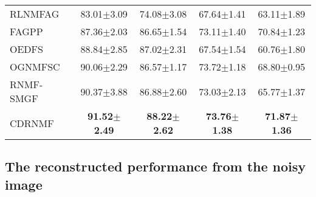 \documentclass[a4paper,fleqn]{cas-sc}
\begin{document}
\begin{table}[ht]
{\begin{tabular}{lcccc}
		RLNMFAG & 83.01$\pm$3.09 & 74.08$\pm$3.08 & 67.64$\pm$1.41 & 63.11$\pm$1.89 \\
		FAGPP & 87.36$\pm$2.03 & 86.65$\pm$1.54 & 73.11$\pm$1.40 & 70.84$\pm$1.23 \\
		OEDFS & 88.84$\pm$2.85 & 87.02$\pm$2.31 & 67.54$\pm$1.54 & 60.76$\pm$1.80 \\
		OGNMFSC & 90.06$\pm$2.29 & 86.57$\pm$1.17 & 73.72$\pm$1.18 & 68.80$\pm$0.95 \\
		RNMF-SMGF & 90.37$\pm$3.88 & 86.88$\pm$2.60 & 73.03$\pm$2.13 & 65.77$\pm$1.37 \\
		CDRNMF & \textbf{91.52$\pm$2.49} & \textbf{88.22$\pm$2.62} & \textbf{73.76$\pm$1.38} & \textbf{71.87$\pm$1.36} \\
		\bottomrule
	\end{tabular}
}
	\label{tab:acc_nmi_combined}
\end{table}


\subsection{The reconstructed performance from the noisy image}
\end{document}
